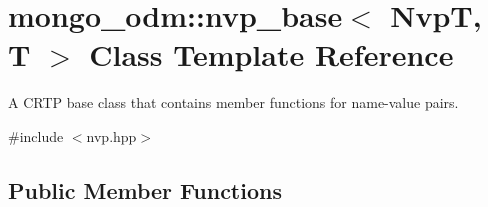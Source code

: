 \hypertarget{classmongo__odm_1_1nvp__base}{}\section{mongo\+\_\+odm\+:\+:nvp\+\_\+base$<$ NvpT, T $>$ Class Template Reference}
\label{classmongo__odm_1_1nvp__base}


A C\+R\+TP base class that contains member functions for name-\/value pairs.  




{\ttfamily \#include $<$nvp.\+hpp$>$}

\subsection*{Public Member Functions}
